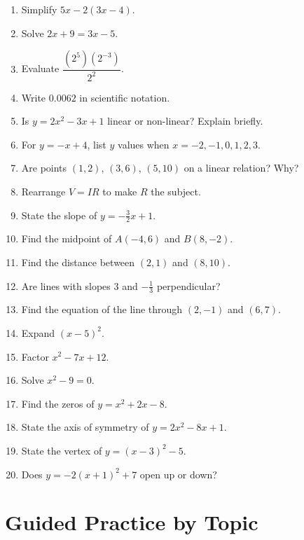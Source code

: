 \documentclass[12pt,oneside]{article}
\newcommand{\ws}[1]{\vspace*{#1}}
\begin{document}
\begin{enumerate}
  \item Simplify $5x-2(3x-4)$. \ws{1.6cm}
  \item Solve $2x+9=3x-5$. \ws{1.6cm}
  \item Evaluate $\dfrac{(2^5)(2^{-3})}{2^2}$. \ws{1.6cm}
  \item Write $0.0062$ in scientific notation. \ws{1.6cm}
  \item Is $y=2x^2-3x+1$ linear or non-linear? Explain briefly. \ws{1.8cm}
  \item For $y=-x+4$, list $y$ values when $x=-2,-1,0,1,2,3$. \ws{2.0cm}
  \item Are points $(1,2)$, $(3,6)$, $(5,10)$ on a linear relation? Why? \ws{1.8cm}
  \item Rearrange $V=IR$ to make $R$ the subject. \ws{1.4cm}
  \item State the slope of $y=-\frac{3}{2}x+1$. \ws{1.3cm}
  \item Find the midpoint of $A(-4,6)$ and $B(8,-2)$. \ws{1.6cm}
  \item Find the distance between $(2,1)$ and $(8,10)$. \ws{1.8cm}
  \item Are lines with slopes $3$ and $-\frac{1}{3}$ perpendicular? \ws{1.5cm}
  \item Find the equation of the line through $(2,-1)$ and $(6,7)$. \ws{2.0cm}
  \item Expand $(x-5)^2$. \ws{1.4cm}
  \item Factor $x^2-7x+12$. \ws{1.4cm}
  \item Solve $x^2-9=0$. \ws{1.5cm}
  \item Find the zeros of $y=x^2+2x-8$. \ws{1.7cm}
  \item State the axis of symmetry of $y=2x^2-8x+1$. \ws{1.4cm}
  \item State the vertex of $y=(x-3)^2-5$. \ws{1.4cm}
  \item Does $y=-2(x+1)^2+7$ open up or down? \ws{1.4cm}
\end{enumerate}

\section{Guided Practice by Topic}
\end{document}
